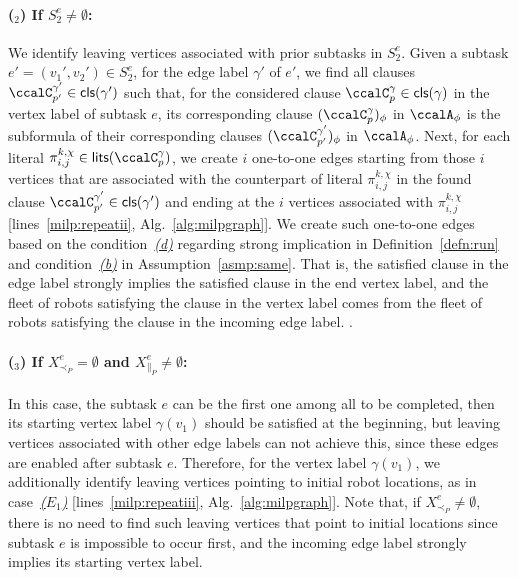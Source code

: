 \documentclass[Afour,sageh,times]{sagej}
\newcounter{mycounter}
\newcommand{\clause}[1]{\mathsf{cls}(#1)}
\newcommand{\autop}{\ccalA_{\phi}}
\renewcommand{\ap}[3]{\mathcal{\pi}_{{#1},{#2}}^{#3}}
\begin{document}
\paragraph{($_2$) If $S_2^e \neq \emptyset$:}\label{edge:vertex2}  We  identify leaving vertices associated with prior subtasks in $S_2^e$. Given a subtask $e' = (v_1', v_2') \in S^e_2$, for the edge label $\gamma'$ of $e'$, we find all clauses $\ccalC_{p'}^{\gamma'} \in  \clause{\gamma'}$ such that, for the considered  clause $\ccalC_p^\gamma \in \clause{\gamma} $ in the vertex label of subtask $e$, its corresponding clause $(\ccalC_p^\gamma)_{\phi}$ in $\autop$ is the subformula of   their corresponding clauses $(\ccalC_{p'}^{\gamma'})_{\phi}$ in $\autop$. Next, for each literal $\ap{i}{j}{k,\chi} \in \mathsf{lits}(\ccalC_p^\gamma)$, we create $i$ one-to-one edges starting from those $i$ vertices that are associated with the counterpart  of literal  $\ap{i}{j}{k,\chi}$ in the found clause  $\ccalC_{p'}^{\gamma'} \in \clause{\gamma'}$  and ending at the $i$ vertices associated with $\ap{i}{j}{k,\chi}$ [lines~\ref{milp:repeatii},  Alg.~\ref{alg:milpgraph}]. We create such one-to-one edges based on the condition~\hyperref[cond:d]{\it (d)} regarding strong implication in Definition~\ref{defn:run} and condition~\hyperref[asmp:b]{\it (b)} in Assumption~\ref{asmp:same}. That is,  the satisfied clause in the edge label strongly implies the satisfied clause in the end vertex label, and the fleet of robots satisfying the clause in the vertex label comes from the fleet of robots satisfying the clause in the incoming edge label.
.

\paragraph{($_3$) If $X_{\prec_P}^e = \emptyset$ and $X_{\|_P}^e \neq \emptyset$:}\label{edge:vertex3} In this case, the subtask $e$ can be the first one among all to be completed, then  its starting vertex label $\gamma(v_1)$  should be satisfied at the beginning, but leaving vertices associated with other edge labels can not achieve this, since these edges are enabled after subtask $e$. Therefore, for the vertex label $\gamma(v_1)$, we additionally identify leaving vertices pointing to initial robot locations, as in case~\hyperref[sec:a]{\it ($E_1$)} [lines~\ref{milp:repeatiii},  Alg.~\ref{alg:milpgraph}]. %
Note that, if $X_{\prec_P }^e \neq \emptyset$,  there is no need to find such leaving vertices that point to initial locations since subtask $e$ is impossible to occur first, and the incoming edge label strongly implies its starting vertex label.
\end{document}
